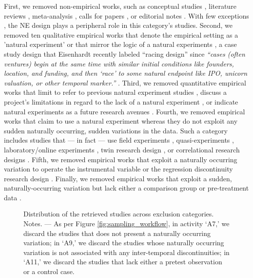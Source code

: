 First, we removed non-empirical works, such as conceptual studies 
\parencite[e.g.,][]{eden2021}, literature reviews
\parencite[e.g.,][]{shaver2020}, meta-analysis
\parencite[e.g.,][]{geyskens2006}, calls for papers
\parencite[e.g.,][]{jacquart2020}, or editorial notes
\parencite[e.g.,][]{breschi2020}. With few exceptions
\parencite[e.g.,][]{sieweke2020}, the NE design plays a peripheral role in this
category's studies. Second, we removed ten qualitative empirical works that 
denote the empirical setting as a 'natural experiment' \parencite[][]{} or that mirror
the logic of a natural experiments \parencite[e.g.,][]{powell2017}, a case study
design that Eisenhardt recently labeled ``racing design'' since \textit{``cases
(often ventures) begin at the same time with similar initial conditions like
founders, location, and funding, and then `race' to some natural endpoint like
IPO, unicorn valuation, or other temporal marker.''} \parencite[page
150,][]{eisenhardt2021}.  Third, we removed quantitative empirical works that limit to refer
to previous natural experiment studies \parencite[e.g.,][]{stevens2021}, discuss
a project's limitations in regard to the lack of a natural experiment
\parencite[e.g.,][]{chen2020}, or indicate natural experiments as a future
research avenues \parencite[e.g.,][]{xie0000}.  Fourth, we removed empirical
works that claim to use a natural experiment whereas they do not exploit any
sudden naturally occurring, sudden variations in the data. Such a category
includes studies that --- in fact --- use field experiments
\parencite[e.g.,][]{lee2017}, quasi-experiments
\parencite[e.g.,][]{azoulay2014}, laboratory/online experiments
\parencite[e.g.,][]{laurieromartinez2014}, twin research design
\parencite[e.g.,][]{nicolaou2008}, or correlational research designs
\parencite[e.g.,][]{boyle2011}. Fifth, we removed empirical works that exploit a
naturally occurring variation to operate the instrumental variable
\parencite[e.g.,][]{zolotoy2018} or the regression discontinuity research design
\parencite[e.g.,][]{flammer2015}.  Finally, we removed empirical works that
exploit a sudden, naturally-occurring  variation but lack either a comparison
group \parencite[e.g.][]{corbo2016} or pre-treatment data
\parencite[e.g.,][]{desjardine2019}.

\begin{figure}
    \centering
    \sffamily
    \begin{small}
        \begin{center}
            
        \end{center}
	\vspace{1em}
        \caption{Distribution of the retrieved studies across exclusion 
        categories. Notes. --- As per Figure \ref{fig:sampling_workflow}, in
        activity `A7,' we discard the studies that does not present a naturally
        occurring variation; in `A9,' we discard the studies whose naturally
        occurring variation is not associated with any inter-temporal
        discontinuities; in `A11,' we discard the studies that lack either a
        pretest observation or a control case.}
        \label{fig:exclusion_causes}
    \end{small}
\end{figure}
